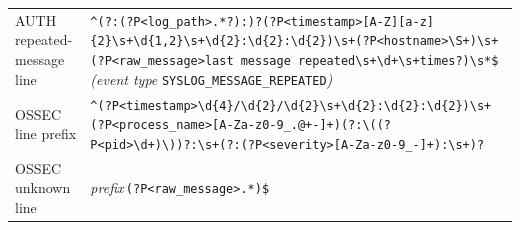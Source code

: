 \documentclass[11pt,a4paper]{article}
\begin{document}
\begin{longtable}{>{\RaggedRight\arraybackslash}p{}>{\RaggedRight\arraybackslash}p{}}
AUTH repeated-message line & \texttt{\textasciicircum{}(\allowbreak{}?\allowbreak{}:\allowbreak{}(\allowbreak{}?\allowbreak{}P<log\_\allowbreak{}path>\allowbreak{}.\allowbreak{}*\allowbreak{}?\allowbreak{})\allowbreak{}:\allowbreak{})\allowbreak{}?\allowbreak{}(\allowbreak{}?\allowbreak{}P<timestamp>\allowbreak{}[\allowbreak{}A-{}Z]\allowbreak{}[\allowbreak{}a-{}z]\allowbreak{}\{2\}\textbackslash{}s+\allowbreak{}\textbackslash{}d\{1,\allowbreak{}2\}\textbackslash{}s+\allowbreak{}\textbackslash{}d\{2\}:\allowbreak{}\textbackslash{}d\{2\}:\allowbreak{}\textbackslash{}d\{2\})\allowbreak{}\textbackslash{}s+\allowbreak{}(\allowbreak{}?\allowbreak{}P<hostname>\allowbreak{}\textbackslash{}S+\allowbreak{})\allowbreak{}\textbackslash{}s+\allowbreak{}(\allowbreak{}?\allowbreak{}P<raw\_\allowbreak{}message>\allowbreak{}last \allowbreak{}message \allowbreak{}repeated\textbackslash{}s+\allowbreak{}\textbackslash{}d+\allowbreak{}\textbackslash{}s+\allowbreak{}times?\allowbreak{})\allowbreak{}\textbackslash{}s*\allowbreak{}\$} \emph{(event type} \texttt{SYSLOG\_\allowbreak{}MESSAGE\_\allowbreak{}REPEATED}\emph{)} \\[3pt]
OSSEC line prefix & \texttt{\textasciicircum{}(\allowbreak{}?\allowbreak{}P<timestamp>\allowbreak{}\textbackslash{}d\{4\}/\allowbreak{}\textbackslash{}d\{2\}/\allowbreak{}\textbackslash{}d\{2\}\textbackslash{}s+\allowbreak{}\textbackslash{}d\{2\}:\allowbreak{}\textbackslash{}d\{2\}:\allowbreak{}\textbackslash{}d\{2\})\allowbreak{}\textbackslash{}s+\allowbreak{}(\allowbreak{}?\allowbreak{}P<process\_\allowbreak{}name>\allowbreak{}[\allowbreak{}A-{}Za-{}z0-{}9\_\allowbreak{}.\allowbreak{}@+\allowbreak{}-{}]\allowbreak{}+\allowbreak{})\allowbreak{}(\allowbreak{}?\allowbreak{}:\allowbreak{}\textbackslash{}(\allowbreak{}(\allowbreak{}?\allowbreak{}P<pid>\allowbreak{}\textbackslash{}d+\allowbreak{})\allowbreak{}\textbackslash{})\allowbreak{})\allowbreak{}?\allowbreak{}:\allowbreak{}\textbackslash{}s+\allowbreak{}(\allowbreak{}?\allowbreak{}:\allowbreak{}(\allowbreak{}?\allowbreak{}P<severity>\allowbreak{}[\allowbreak{}A-{}Za-{}z0-{}9\_\allowbreak{}-{}]\allowbreak{}+\allowbreak{})\allowbreak{}:\allowbreak{}\textbackslash{}s+\allowbreak{})\allowbreak{}?\allowbreak{}} \\[3pt]
OSSEC unknown line & \emph{prefix}\,\texttt{(\allowbreak{}?\allowbreak{}P<raw\_\allowbreak{}message>\allowbreak{}.\allowbreak{}*\allowbreak{})\allowbreak{}\$} \\[3pt]
\end{longtable}
\endgroup
\end{document}
